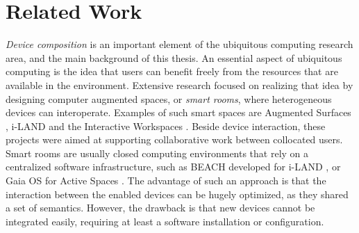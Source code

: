 \chapter{Related Work}
\label{relatedwork}



\emph{Device composition} is an important element of the ubiquitous computing research area, and the main background of this thesis.
An essential aspect of ubiquitous computing is the idea that users can benefit freely from the resources that are available in the environment.
Extensive research focused on realizing that idea by designing computer augmented spaces, or \emph{smart rooms}, where heterogeneous devices can interoperate.
Examples of such smart spaces are Augmented Surfaces \citep{Rekimoto:1999:augmentedsurfaces}, 
\mbox{i-LAND} \citep{Streitz:1999:iland} and the Interactive Workspaces \citep{Johanson:2002:iroom}.
Beside device interaction, these projects were aimed at supporting collaborative work between collocated users.
Smart rooms are usually closed computing environments that rely on a centralized software infrastructure, such as BEACH developed for i-LAND \citep{Tandler:2001:smartenv}, or Gaia OS for Active Spaces \citep{Roman:2002:gaia}.
The advantage of such an approach is that the interaction between the enabled devices can be hugely optimized, as they shared a set of semantics.
However, the drawback is that new devices cannot be integrated easily, requiring at least a software installation or configuration.

